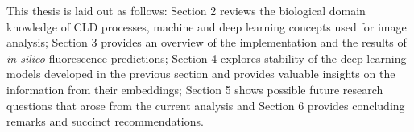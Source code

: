 This thesis is laid out as follows: Section 2 reviews the biological domain knowledge of CLD processes, machine and deep learning concepts used for image analysis; Section 3 provides an overview of the implementation and the results of \textit{in silico} fluorescence predictions; Section 4 explores stability of the deep learning models developed in the previous section and provides valuable insights on the information from their embeddings; Section 5 shows possible future research questions that arose from the current analysis and Section 6 provides concluding remarks and succinct recommendations.